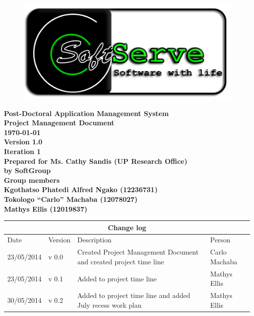 \documentclass[12pt]{article}
\newcommand{\Title}{Project Management Document} %
\newcommand{\ssr}{Soft\color{green}{Serve }\color{black}}
\newcommand{\version}{1.0}
\newcommand{\iteration}{1}
\newcommand{\client}{Ms. Cathy Sandis (UP Research Office)}
\newcommand{\project}{Post-Doctoral Application Management System}
\begin{document}
\vspace{4em}

\begin{center}%

\begin{figure}[ht!]
\centering
\includegraphics{../Images_Docs/logo.png}
\end{figure}
\LARGE \bf \project \\[1em]
\LARGE \bf \Title \\[0.25em]
\large \bf \today\\
\bf Version \version\\
\bf Iteration \iteration\\[0.5em]
\Large \bf Prepared for \client\\
\Large \bf by
\Large {\bf \ssr Group }\\[0.5em]
\LARGE {\bf Group members}\\[0.25em]
\large
Kgothatso Phatedi Alfred Ngako (12236731) \\[0.5em]
Tokologo “Carlo” Machaba (12078027) \\[0.5em]
Mathys Ellis (12019837) \\[8em]

\end{center}%


\begin{center}
\begin{tabular}{|l|p{1.4cm}|p{8cm}|p{2.8cm}|}
\hline
\multicolumn{4}{|c|}{\bf Change log} \\
\hline
 Date & Version & Description &  Person \\
\hline
23/05/2014 & v 0.0 & Created Project Management Document and created project time line & Carlo Machaba \\
\hline
23/05/2014 & v 0.1 & Added to project time line & Mathys Ellis \\
\hline
30/05/2014 & v 0.2 & Added to project time line and added July recess work plan & Mathys Ellis \\
\hline

\end{tabular}
\end{center}
\newpage
\tableofcontents
\end{document}
